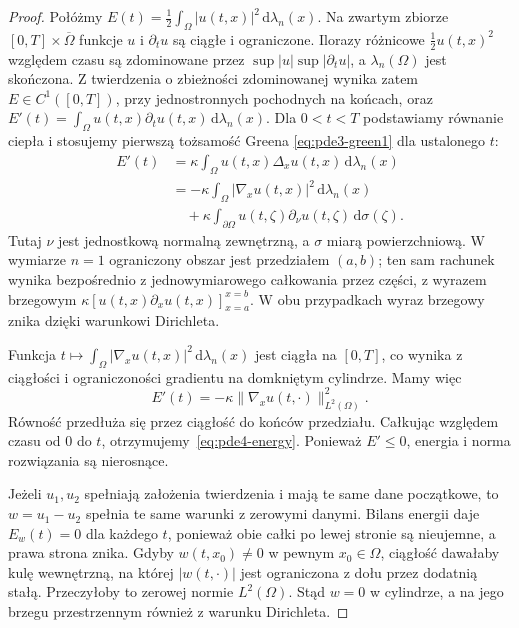 \begin{proof}
Połóżmy $E(t)=\frac12\int_\Omega |u(t,x)|^2
\,\mathrm d\lambda_n(x)$. Na zwartym zbiorze
$[0,T]\times\overline\Omega$ funkcje $u$ i $\partial_tu$
są ciągłe i ograniczone. Ilorazy różnicowe
$\frac12u(t,x)^2$ względem czasu są zdominowane
przez $\sup|u|\sup|\partial_tu|$, a $\lambda_n(\Omega)$
jest skończona. Z twierdzenia o zbieżności zdominowanej
wynika zatem $E\in C^1([0,T])$, przy jednostronnych
pochodnych na końcach, oraz
$E'(t)=\int_\Omega u(t,x)\partial_tu(t,x)
\,\mathrm d\lambda_n(x)$.
Dla $0<t<T$ podstawiamy równanie ciepła
i stosujemy pierwszą tożsamość Greena
\eqref{eq:pde3-green1} dla ustalonego $t$:
\[
 \begin{aligned}
 E'(t)
 &=\kappa\int_\Omega u(t,x)\Delta_x u(t,x)
             \,\mathrm d\lambda_n(x)\\
 &=-\kappa\int_\Omega|\nabla_xu(t,x)|^2\,\mathrm d\lambda_n(x)\\
 &\quad+\kappa\int_{\partial\Omega}
 u(t,\zeta)\partial_\nu u(t,\zeta)\,\mathrm d\sigma(\zeta).
 \end{aligned}
\]
Tutaj $\nu$ jest jednostkową normalną zewnętrzną,
a $\sigma$ miarą powierzchniową.
W wymiarze $n=1$ ograniczony obszar jest przedziałem
$(a,b)$; ten sam rachunek wynika bezpośrednio
z jednowymiarowego całkowania przez części,
z wyrazem brzegowym
$\kappa[u(t,x)\partial_xu(t,x)]_{x=a}^{x=b}$.
W obu przypadkach wyraz brzegowy znika
dzięki warunkowi Dirichleta.

Funkcja $t\mapsto\int_\Omega|\nabla_xu(t,x)|^2
\,\mathrm d\lambda_n(x)$ jest ciągła na $[0,T]$,
co wynika z ciągłości i ograniczoności gradientu
na domkniętym cylindrze. Mamy więc
\[
 E'(t)=-\kappa\|\nabla_xu(t,\cdot)\|_{L^2(\Omega)}^2.
\]
Równość przedłuża się przez ciągłość do końców
przedziału. Całkując względem czasu od $0$ do $t$,
otrzymujemy~\eqref{eq:pde4-energy}.
Ponieważ $E'\leq0$, energia i norma rozwiązania
są nierosnące.

Jeżeli $u_1,u_2$ spełniają założenia twierdzenia
i mają te same dane początkowe, to $w=u_1-u_2$
spełnia te same warunki z zerowymi danymi.
Bilans energii daje $E_w(t)=0$ dla każdego $t$,
ponieważ obie całki po lewej stronie
są nieujemne, a prawa strona znika.
Gdyby $w(t,x_0)\ne0$ w pewnym $x_0\in\Omega$,
ciągłość dawałaby kulę wewnętrzną, na której
$|w(t,\cdot)|$ jest ograniczona z dołu przez
dodatnią stałą. Przeczyłoby to zerowej normie
$L^2(\Omega)$. Stąd $w=0$ w cylindrze, a na jego
brzegu przestrzennym również z warunku Dirichleta.
\end{proof}

